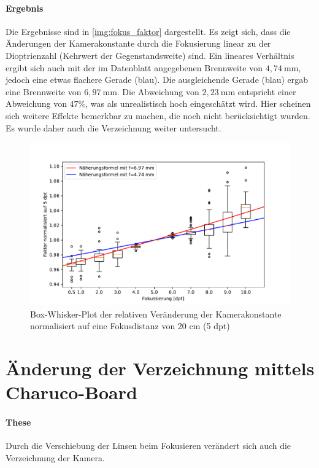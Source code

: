 \documentclass[./00PhotoBox.tex]{subfiles}
\begin{document}
\paragraph{Ergebnis}
Die Ergebnisse sind in \autoref{img:fokus_faktor} dargestellt. Es zeigt sich, dass die Änderungen der Kamerakonstante durch die Fokusierung linear zu der Dioptrienzahl (Kehrwert der Gegenstandsweite) sind. Ein lineares Verhältnis ergibt sich auch mit der im Datenblatt angegebenen Brennweite von $4,74~\text{mm}$, jedoch eine etwas flachere Gerade (blau). Die ausgleichende Gerade (blau) ergab eine Brennweite von $6,97~\text{mm}$. Die Abweichung von $2,23~\text{mm}$ entspricht einer Abweichung von $47\%$, was als unrealistisch hoch eingeschätzt wird. Hier scheinen sich weitere Effekte bemerkbar zu machen, die noch nicht berücksichtigt wurden. Es wurde daher auch die Verzeichnung weiter untersucht.

\begin{figure}
    \centering
    \includegraphics[width=1\textwidth]{./img/fokus_faktor_diagramm_box.pdf}
    \caption{Box-Whisker-Plot der relativen Veränderung der Kamerakonstante normalisiert auf eine Fokusdistanz von 20 cm (5 dpt)} %
    \label{img:fokus_faktor} %
\end{figure}



\section{Änderung der Verzeichnung mittels Charuco-Board}

\paragraph{These}
Durch die Verschiebung der Linsen beim Fokusieren verändert sich auch die Verzeichnung der Kamera.
\end{document}
